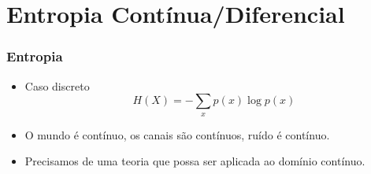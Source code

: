 \section{Entropia Contínua/Diferencial}

\begin{frame}[allowframebreaks]
  \frametitle{Entropia}
  \begin{itemize}
  \item Caso discreto
	\begin{equation}
	H(X) = - \sum_x p(x) \log p(x)
	\end{equation}
  \item O mundo é contínuo, os canais são contínuos, ruído é contínuo.
  \item Precisamos de uma teoria que possa ser aplicada ao domínio contínuo.
  \end{itemize}
\end{frame}


